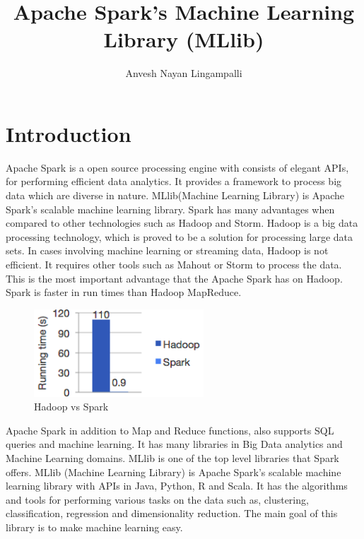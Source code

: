 \documentclass[9pt,twocolumn,twoside]{../../styles/osajnl}
\title{Apache Spark's Machine Learning Library (MLlib)}
\author[1]{Anvesh Nayan Lingampalli}
\affil[1]{School of Informatics and Computing, Bloomington, IN 47408, U.S.A.}
\affil[*]{Corresponding authors: anveling@umail.iu.edu}
\begin{document}
\maketitle

\section{Introduction}

Apache Spark\cite{www-spark} is a open source processing engine with
consists of elegant APIs, for performing efficient data analytics. It
provides a framework to process big data which are diverse in
nature. MLlib(Machine Learning Library) is Apache Spark's scalable
machine learning library\cite{www-mllib}. Spark has many advantages
when compared to other technologies such as Hadoop and
Storm. Hadoop\cite{www-hadoop} is a big data processing technology,
which is proved to be a solution for processing large data sets. In
cases involving machine learning or streaming data, Hadoop is not
efficient. It requires other tools such as Mahout\cite{www-mahout} or
Storm\cite{www-storm} to process the data. This is the most important
advantage that the Apache Spark has on Hadoop. Spark is faster in run
times than Hadoop MapReduce\cite{www-mapreduce}.

\begin{figure}[htbp]
\begin{center}
\centering
\includegraphics[width= 2.5in]{images/hadoopvspark}
\caption{Hadoop vs Spark}
\label{fig:false-color}
\end{center}
\end{figure}

Apache Spark in addition to Map and Reduce functions, also supports
SQL queries and machine learning. It has many libraries in Big Data
analytics and Machine Learning domains. MLlib is one of the top level
libraries that Spark offers.  MLlib (Machine Learning Library) is
Apache Spark’s scalable machine learning library with APIs in Java,
Python, R and Scala. It has the algorithms and tools for performing
various tasks on the data such as, clustering, classification,
regression and dimensionality reduction. The main goal of this library
is to make machine learning easy.
\end{document}
